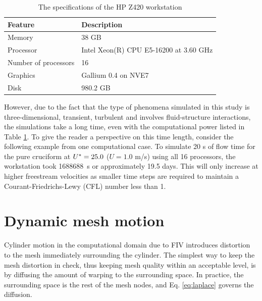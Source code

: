 \documentclass[oneside]{utmthesis}
\begin{document}
\begin{table}[!ht]
\centering
\caption{The specifications of the HP Z420 workstation} \label{tab:workstationSpec}
\vspace{\baselineskip}
\begin{tabular}{l l}
  \hline
  \hline

  Feature               & Description                            \\
  \hline

  Memory                & 38 GB                                  \\
  Processor             & Intel Xeon(R) CPU E5-16200 at 3.60 GHz \\
  Number of processors  & 16                                     \\
  Graphics              & Gallium 0.4 on NVE7                    \\
  Disk                  & 980.2 GB                               \\
  \hline
  \hline
\end{tabular}
\end{table}

However, due to the fact that the type of phenomena simulated in this study is three-dimensional, transient, turbulent and involves fluid-structure interactions, the simulations take a long time, even with the computational power listed in Table \ref{tab:workstationSpec}. To give the reader a perspective on this time length, consider the following example from one computational case. To simulate 20 s of flow time for the pure cruciform at $U^{*} = 25.0$ ($U = 1.0$ m/s) using all 16 processors, the workstation took \SI{1688688}{\second} or approximately 19.5 days. This will only increase at higher freestream velocities as smaller time steps are required to maintain a Courant-Friedrichs-Lewy (CFL) number less than 1.

\section{Dynamic mesh motion} \label{sec:dynMesh}

Cylinder motion in the computational domain due to FIV introduces distortion to the mesh immediately surrounding the cylinder. The simplest way to keep the mesh distortion in check, thus keeping mesh quality within an acceptable level, is by diffusing the amount of warping to the surrounding space. In practice, the surrounding space is the rest of the mesh nodes, and Eq. \ref{eq:laplace} governs the diffusion.
\end{document}
